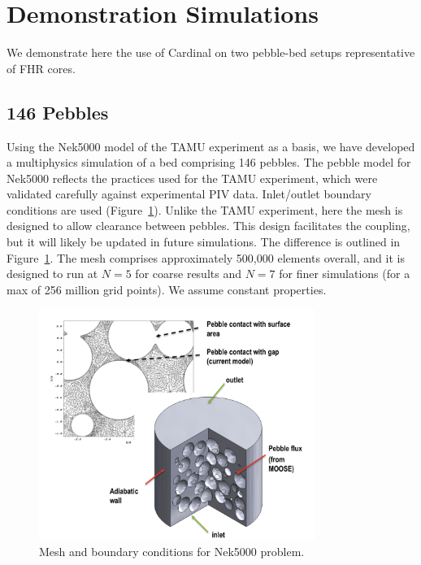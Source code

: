 \section{Demonstration Simulations}
\label{s:demo}

We demonstrate here the use of Cardinal on two pebble-bed setups representative of FHR cores.

\subsection{146 Pebbles}
\label{ss:c4}

Using the Nek5000 model of the TAMU experiment as a basis, we have developed a multiphysics simulation of a bed comprising 146 pebbles.
The pebble model for Nek5000 reflects the practices used for the TAMU experiment, which were validated carefully against experimental PIV data. Inlet/outlet boundary conditions are used (Figure~\ref{f:pb2}). Unlike the TAMU experiment, here the mesh is designed to allow clearance between pebbles. This design facilitates the coupling, but it will likely be updated in future simulations. The difference is outlined in Figure~\ref{f:pb2}. The mesh comprises approximately 500,000 elements overall, and it is designed to run at $N=5$ for coarse results and $N=7$ for finer simulations (for a max of 256 million grid points). We assume constant properties.

\begin{figure}[!h]
\centering
\includegraphics[clip=true,width=0.8\textwidth]{Figures/pb_mesh}
\caption{Mesh and boundary conditions for Nek5000 problem.}
\label{f:pb2}
\end{figure}

